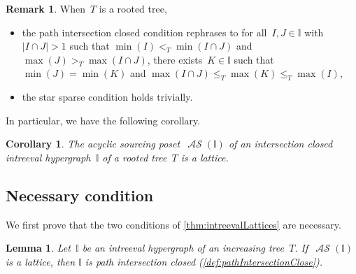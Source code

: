 \documentclass{amsart}
\newtheorem{corollary}[theorem]{Corollary}
\newtheorem{lemma}[theorem]{Lemma}
\theoremstyle{definition}
\newtheorem{remark}[theorem]{Remark}
\DeclareMathOperator{\ASour}{\mathcal{AS}}  %
\newcommand{\II}{\mathbb I} %
\begin{document}
\begin{remark}
When~$T$ is a rooted tree,
\begin{itemize}
\item the path intersection closed condition rephrases to for all~$I,J\in \II$ with~$|I\cap J|> 1$ such that $\min(I) <_T \min(I\cap J)$ and  $\max(J) >_T \max(I\cap J)$, there exists~$K \in \II$ such that $\min(J) = \min(K)$ and ${\max(I\cap J) \le_T \max(K) \le_T \max(I)}$,
\item the star sparse condition holds trivially.
\end{itemize}
In particular, we have the following corollary.
\end{remark}

\begin{corollary}
The acyclic sourcing poset~$\ASour(\II)$ of an intersection closed intreeval hypergraph~$\II$ of a rooted tree~$T$ is a lattice.
\end{corollary}


\subsection{Necessary condition}
\label{subsec:necessary}

We first prove that the two conditions of \cref{thm:intreevalLattices} are necessary.

\begin{lemma}
\label{lem:pathIntersectionClosed}
Let~$\II$ be an intreeval hypergraph of an increasing tree~$T$.
If~$\ASour(\II)$ is a lattice, then $\II$ is path intersection closed (\cref{def:pathIntersectionClose}).
\end{lemma}
\end{document}
